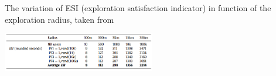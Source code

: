 \documentclass[a4paper,12pt]{article}
\begin{document}
\begin{table}[h]
\caption{The variation of ESI (exploration satisfaction indicator) in function of the exploration radius, taken from \cite{SC}}
\label{table_2}
\centering
\includegraphics[width=0.5\textwidth]{esi_table}
\end{table}
\end{document}
